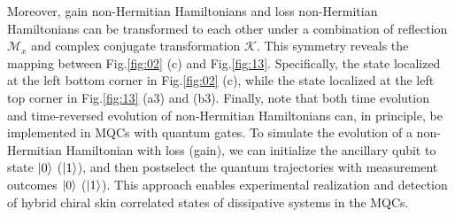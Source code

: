 \documentclass[longbibliography, aps, prx, amsmath, amssymb, amsfonts, twocolumn,superscriptaddress, footinbib]{revtex4-1}
\begin{document}

	Moreover, gain non-Hermitian Hamiltonians and loss non-Hermitian Hamiltonians can be transformed to each other under a combination of reflection $\mathcal{M}_x$ and complex conjugate transformation $\mathcal{K}$.
	This symmetry reveals the mapping between Fig.\ref{fig:02} (c) and Fig.\ref{fig:13}. Specifically, the state localized at the left bottom corner in Fig.\ref{fig:02} (c), while the state localized at the left top corner in Fig.\ref{fig:13} (a3) and (b3).
	Finally, note that both time evolution and time-reversed evolution of non-Hermitian Hamiltonians can, in principle, be implemented in MQCs with quantum gates. To simulate the evolution of a non-Hermitian Hamiltonian with loss (gain), we can initialize the ancillary qubit to state $\ket{0}$ ($\ket{1}$), and then postselect the quantum trajectories with measurement outcomes $\ket{0}$ ($\ket{1}$). This approach enables experimental realization and detection of hybrid chiral skin correlated states of dissipative systems in the MQCs.



\end{document}
